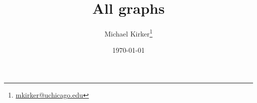 \documentclass[12pt]{article}
\begin{document}


\title{All graphs}
\author{Michael Kirker\thanks{\href{mailto:mkirker@uchicago.edu}{mkirker@uchicago.edu}}}
\date{\today}

















\end{document}
